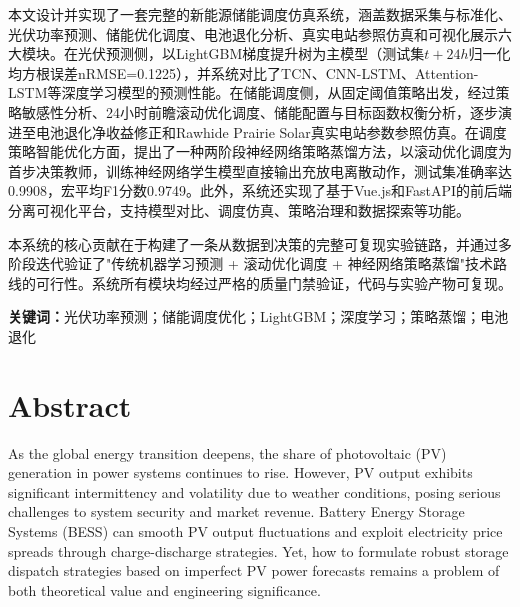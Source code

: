 \documentclass[12pt,a4paper]{ctexbook}
\begin{document}
本文设计并实现了一套完整的新能源储能调度仿真系统，涵盖数据采集与标准化、光伏功率预测、储能优化调度、电池退化分析、真实电站参照仿真和可视化展示六大模块。在光伏预测侧，以LightGBM梯度提升树为主模型（测试集$t+24h$归一化均方根误差nRMSE=0.1225），并系统对比了TCN、CNN-LSTM、Attention-LSTM等深度学习模型的预测性能。在储能调度侧，从固定阈值策略出发，经过策略敏感性分析、24小时前瞻滚动优化调度、储能配置与目标函数权衡分析，逐步演进至电池退化净收益修正和Rawhide Prairie Solar真实电站参数参照仿真。在调度策略智能优化方面，提出了一种两阶段神经网络策略蒸馏方法，以滚动优化调度为首步决策教师，训练神经网络学生模型直接输出充放电离散动作，测试集准确率达0.9908，宏平均F1分数0.9749。此外，系统还实现了基于Vue.js和FastAPI的前后端分离可视化平台，支持模型对比、调度仿真、策略治理和数据探索等功能。

本系统的核心贡献在于构建了一条从数据到决策的完整可复现实验链路，并通过多阶段迭代验证了"传统机器学习预测 + 滚动优化调度 + 神经网络策略蒸馏"技术路线的可行性。系统所有模块均经过严格的质量门禁验证，代码与实验产物可复现。

\vspace{1cm}
\noindent\textbf{关键词：}光伏功率预测；储能调度优化；LightGBM；深度学习；策略蒸馏；电池退化

\newpage

\chapter*{Abstract}

As the global energy transition deepens, the share of photovoltaic (PV) generation in power systems continues to rise. However, PV output exhibits significant intermittency and volatility due to weather conditions, posing serious challenges to system security and market revenue. Battery Energy Storage Systems (BESS) can smooth PV output fluctuations and exploit electricity price spreads through charge-discharge strategies. Yet, how to formulate robust storage dispatch strategies based on imperfect PV power forecasts remains a problem of both theoretical value and engineering significance.
\end{document}
